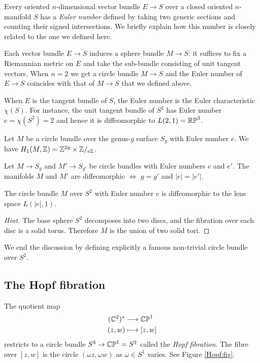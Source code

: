 \begin{oss} \label{bundle:oss}
Every oriented $n$-dimensional vector bundle $E \to S$ over a closed oriented $n$-manifold $S$ has a \emph{Euler number} defined by taking two generic sections and counting their signed intersections. We briefly explain how this number is closely related to the one we defined here.

Each vector bundle $E \to S$ induces a sphere bundle $M\to S$: it suffices to fix a Riemannian metric on $E$ and take the sub-bundle consisting of unit tangent vectors. When $n=2$ we get a circle bundle $M\to S$ and the Euler number of $E\to S$ coincides with that of $M\to S$ that we defined above.

When $E$ is the tangent bundle of $S$, the Euler number is the Euler characteristic $\chi(S)$. For instance, the unit tangent bundle of $S^2$ has Euler number $e=\chi(S^2)=2$ and hence it is diffeomorphic to $L(2,1) = \mathbb{RP}^3$. 
\end{oss}

\begin{ex} \label{bundle:ex}
Let $M$ be a circle bundle over the genus-$g$ surface $S_g$ with Euler number $e$. We have 
$H_1(M,\mathbb{Z}) = \mathbb{Z}^{2g} \times \mathbb{Z}/_{e\mathbb{Z}}$.
\end{ex}

\begin{cor} \label{distinct:bundle:cor}
Let $M \to S_g$ and $M' \to S_{g'}$ be circle bundles with Euler numbers $e$ and $e'$. The manifolds $M$ and $M'$ are diffeomorphic $\Longleftrightarrow$ $g=g'$ and $|e|=|e'|$.
\end{cor}

\begin{ex} \label{e:ex}
The circle bundle $M$ over $S^2$ with Euler number $e$ is diffeomorphic to the lens space $L(|e|,1)$.
\end{ex}
\begin{proof}[Hint] The base sphere $S^2$ decomposes into two discs, and the fibration over each disc is a solid torus. Therefore $M$ is the union of two solid tori.
\end{proof}

We end the discussion by defining explicitly a famous non-trivial circle bundle over $S^2$.

\subsection{The Hopf fibration} \label{Hopf:lens:subsection}
The quotient map 
\begin{align*}
(\mathbb{C}^2)^* & \longrightarrow \mathbb{CP}^1 \\
(z,w) & \longmapsto [z,w]
\end{align*}
restricts to a circle bundle $S^3 \to \mathbb{CP}^1 = S^2$ called the \emph{Hopf fibration}.
The fibre over $[z,w]$ is the circle $(\omega z, \omega w)$ as $\omega \in S^1$ varies. See Figure \ref{Hopf:fig}.

